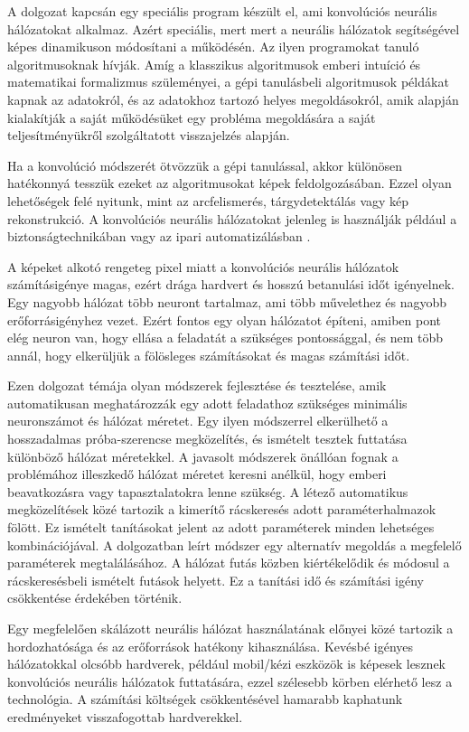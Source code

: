 \documentclass[12pt]{report}
\begin{document}
A dolgozat kapcsán egy speciális program készült el, ami konvolúciós neurális hálózatokat alkalmaz. Azért speciális, mert mert a neurális hálózatok segítségével képes dinamikuson módosítani a működésén. Az ilyen programokat tanuló algoritmusoknak hívják. Amíg a klasszikus algoritmusok emberi intuíció és matematikai formalizmus szüleményei, a gépi tanulásbeli algoritmusok példákat kapnak az adatokról, és az adatokhoz tartozó helyes megoldásokról, amik alapján kialakítják a saját működésüket egy probléma megoldására a saját teljesítményükről szolgáltatott visszajelzés alapján.

Ha a konvolúció módszerét ötvözzük a gépi tanulással, akkor különösen hatékonnyá tesszük ezeket az algoritmusokat képek feldolgozásában. Ezzel olyan lehetőségek felé nyitunk, mint az arcfelismerés, tárgydetektálás vagy kép rekonstrukció. A konvolúciós neurális hálózatokat jelenleg is használják például a biztonságtechnikában vagy az ipari automatizálásban \cite{applications}.

A képeket alkotó rengeteg pixel miatt a konvolúciós neurális hálózatok számításigénye magas, ezért drága hardvert és hosszú betanulási időt igényelnek. Egy nagyobb hálózat több neuront tartalmaz, ami több művelethez és nagyobb erőforrásigényhez vezet. Ezért fontos egy olyan hálózatot építeni, amiben pont elég neuron van, hogy ellása a feladatát a szükséges pontossággal, és nem több annál, hogy elkerüljük a fölösleges számításokat és magas számítási időt.

Ezen dolgozat témája olyan módszerek fejlesztése és tesztelése, amik automatikusan meghatározzák egy adott feladathoz szükséges minimális neuronszámot és hálózat méretet. Egy ilyen módszerrel elkerülhető a hosszadalmas próba-szerencse megközelítés, és ismételt tesztek futtatása különböző hálózat méretekkel. A javasolt módszerek önállóan fognak a problémához illeszkedő hálózat méretet keresni anélkül, hogy emberi beavatkozásra vagy tapasztalatokra lenne szükség. A létező automatikus megközelítések közé tartozik a kimerítő rácskeresés adott paraméterhalmazok fölött. Ez ismételt tanításokat jelent az adott paraméterek minden lehetséges kombinációjával. A dolgozatban leírt módszer egy alternatív megoldás a megfelelő paraméterek megtalálásához. A hálózat futás közben kiértékelődik és módosul a rácskeresésbeli ismételt futások helyett. Ez a tanítási idő és számítási igény csökkentése érdekében történik.

Egy megfelelően skálázott neurális hálózat használatának előnyei közé tartozik a hordozhatósága és az erőforrások hatékony kihasználása. Kevésbé igényes hálózatokkal olcsóbb hardverek, például mobil/kézi eszközök is képesek lesznek konvolúciós neurális hálózatok futtatására, ezzel szélesebb körben elérhető lesz a technológia. A számítási költségek csökkentésével hamarabb kaphatunk eredményeket visszafogottab hardverekkel.
\end{document}
